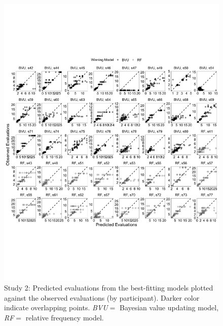 \documentclass[a4paper, man, floatsintext]{apa6}
\begin{document}
\begin{figure}[htb]

{\centering \includegraphics[width=\textwidth]{../figures/fig5-1} 

}

\caption{Study 2: Predicted evaluations from the best-fitting models plotted against the observed evaluations (by participant). Darker color indicate overlapping points. \textit{BVU}$=$ Bayesian value updating model, \textit{RF}$=$ relative frequency model.}\label{fig:fig5}
\end{figure}
\end{document}
